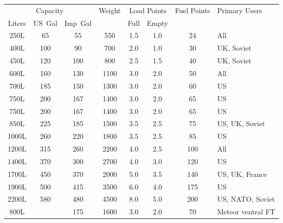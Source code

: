 \begin{twocolumntablefloat}
\begin{twocolumntable}
{
\begin{tabular}{cccccccl}
\toprule
\multicolumn{3}{c}{Capacity}&
Weight&
\multicolumn{2}{c}{Load Points}&
Fuel Points&
Primary Users\\
\cmidrule{1-3}
\cmidrule{5-6}
Liters&US~Gal&Imp~Gal&&Full&Empty&&\\
\midrule
\phantom{0}250L&\phantom{0}65&\phantom{0}55&\phantom{0}550&1.5&1.0&\phantom{0}24&All\\
\phantom{0}400L&\phantom{}100&\phantom{0}90&\phantom{0}700&2.0&1.0&\phantom{0}30&UK, Soviet\\
\phantom{0}450L&\phantom{}120&\phantom{}100&\phantom{0}800&2.5&1.5&\phantom{0}40&UK, Soviet\\
\phantom{0}600L&\phantom{}160&\phantom{0}130&\phantom{}1100&3.0&2.0&\phantom{0}50&All\\
\phantom{0}700L&\phantom{}185&\phantom{0}150&\phantom{}1300&3.0&2.0&\phantom{0}60&US\\
\phantom{0}750L&\phantom{}200&\phantom{0}167&\phantom{}1400&3.0&2.0&\phantom{0}65&US\\
\phantom{0}750L&\phantom{}200&\phantom{0}167&\phantom{}1400&3.0&2.0&\phantom{0}65&US\\
\phantom{0}850L&\phantom{}225&\phantom{0}185&\phantom{}1500&3.5&2.5&\phantom{0}75&US, UK, Soviet\\
\phantom{}1000L&\phantom{}260&\phantom{0}220&\phantom{}1800&3.5&2.5&\phantom{0}85&US\\
\phantom{}1200L&\phantom{}315&\phantom{0}260&\phantom{}2200&4.0&2.5&\phantom{}100&All\\
\phantom{}1400L&\phantom{}370&\phantom{0}300&\phantom{}2700&4.0&3.0&\phantom{}120&US\\
\phantom{}1700L&\phantom{}450&\phantom{0}370&\phantom{}2000&5.0&3.5&\phantom{}140&US, UK, France\\
\phantom{}1900L&\phantom{}500&\phantom{0}415&\phantom{}3500&6.0&4.0&\phantom{}175&US\\
\phantom{}2200L&\phantom{}580&\phantom{0}480&\phantom{}4500&8.0&5.0&\phantom{}200&US, NATO, Soviet\\
\midrule
\phantom{0}800L&\phantom{}&\phantom{0}175&\phantom{}1600&3.0&2.0&\phantom{0}70&Meteor ventral FT\\
\bottomrule
\end{tabular}

}
\end{twocolumntable}
\end{twocolumntablefloat}